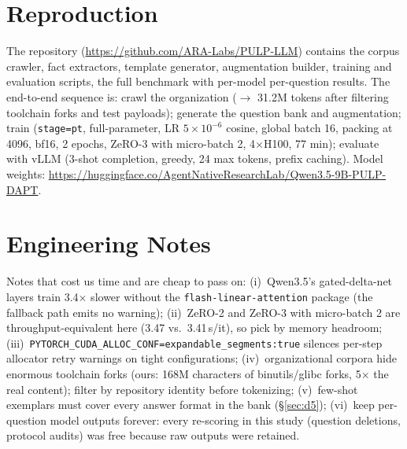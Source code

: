 \section{Reproduction}
\label{app:repro}

The repository (\url{https://github.com/ARA-Labs/PULP-LLM})
contains the corpus crawler, fact extractors, template generator, augmentation
builder, training and evaluation scripts, the full benchmark with per-model
per-question results. The
end-to-end sequence is: crawl the organization ($\rightarrow$ 31.2M tokens
after filtering toolchain forks and test payloads); generate the question bank
and augmentation; train (\texttt{stage=pt}, full-parameter, LR
$5\times10^{-6}$ cosine, global batch 16, packing at 4096, bf16, 2 epochs,
ZeRO-3 with micro-batch 2, 4$\times$H100, 77 min); evaluate with vLLM (3-shot
completion, greedy, 24 max tokens, prefix caching). Model weights:
\url{https://huggingface.co/AgentNativeResearchLab/Qwen3.5-9B-PULP-DAPT}.

\section{Engineering Notes}
\label{app:eng}

Notes that cost us time and are cheap to pass on: (i)~Qwen3.5's gated-delta-net
layers train 3.4$\times$ slower without the \texttt{flash-linear-attention}
package (the fallback path emits no warning); (ii)~ZeRO-2 and ZeRO-3 with
micro-batch 2 are throughput-equivalent here (3.47 vs.\ 3.41\,s/it), so pick
by memory headroom; (iii)~\texttt{PYTORCH\_CUDA\_ALLOC\_CONF=expandable\_segments:true}
silences per-step allocator retry warnings on tight configurations;
(iv)~organizational corpora hide enormous toolchain forks (ours: 168M
characters of binutils/glibc forks, 5$\times$ the real content); filter by
repository identity before tokenizing; (v)~few-shot exemplars must cover every
answer format in the bank (\S\ref{sec:d5}); (vi)~keep per-question model
outputs forever: every re-scoring in this study (question deletions, protocol
audits) was free because raw outputs were retained.
